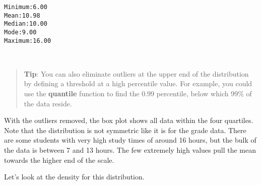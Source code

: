 \documentclass[11pt]{article}
\begin{document}
    \begin{Verbatim}[commandchars=\\\{\}]
Minimum:6.00
Mean:10.98
Median:10.00
Mode:9.00
Maximum:16.00

    \end{Verbatim}

    \begin{center}
    \end{center}
    { \hspace*{\fill} \\}
    
    \begin{quote}
\textbf{Tip}: You can also eliminate outliers at the upper end of the
distribution by defining a threshold at a high percentile value. For
example, you could use the \textbf{quantile} function to find the 0.99
percentile, below which 99\% of the data reside.
\end{quote}

With the outliers removed, the box plot shows all data within the four
quartiles. Note that the distribution is not symmetric like it is for
the grade data. There are some students with very high study times of
around 16 hours, but the bulk of the data is between 7 and 13 hours. The
few extremely high values pull the mean towards the higher end of the
scale.

Let's look at the density for this distribution.
\end{document}
